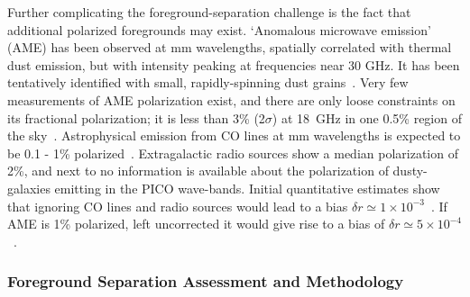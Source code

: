 \documentclass[PICOReport.tex]{subfiles}
\begin{document}
Further complicating the foreground-separation challenge is the fact that additional polarized foregrounds may exist.  `Anomalous microwave emission' (AME) has been observed at mm wavelengths, spatially correlated with thermal dust emission, but with intensity peaking at frequencies near 30 GHz. It has been tentatively identified with small, rapidly-spinning dust grains~\citep{dickinson/etal:2018}. Very few measurements of AME polarization exist, and there are only loose constraints on its fractional polarization; it is less than 3\% (2$\sigma$) at 18~GHz in one 0.5\% region of the sky~\citep{genova_santos:2015}.  Astrophysical emission from CO lines at mm wavelengths is expected to be 0.1 - 1\% polarized~\citep{greeves1999, puglisi2017}.  Extragalactic radio sources show a median polarization of 2\%, and next to no information is available about the polarization of dusty-galaxies emitting in the PICO wave-bands. Initial quantitative estimates show that ignoring CO lines and radio sources would lead to a bias $\delta r \simeq 1\times10^{-3}$~\citep{toffolatti2012,trombetti2018_fracpol, puglisi2018_polsource,remazeilles2018}. If AME is 1\% polarized, left uncorrected it would give rise to a bias of $\delta r \simeq 5\times10^{-4}$~\citep{remazeilles2016}.

\subsubsection{Foreground Separation Assessment and Methodology}
\label{sec:foreground_separation_methodology}



\end{document}
